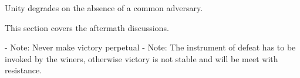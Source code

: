 Unity degrades on the absence of a common adversary. 

This section covers the aftermath discussions. 

    - Note: Never make victory perpetual
    - Note: The instrument of defeat has to be invoked by the winers, otherwise victory is not stable and will be meet with resistance. 